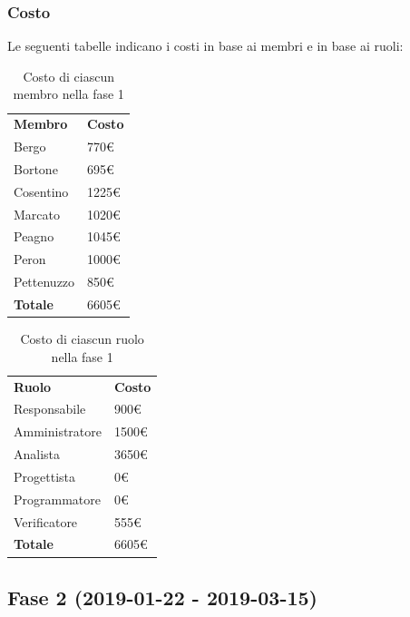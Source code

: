 	\subsubsection{Costo}
		Le seguenti tabelle indicano i costi in base ai membri e in base ai ruoli:
		\begin{table}[H]
			\centering		
			\begin{tabular}{| l | l |}
				\rowcolor{LightBlue}
				\textbf{\color{white}Membro}
				& \textbf{\color{white}Costo}\\
			
				Bergo 				& 770€\\
				Bortone 			& 695€\\
				Cosentino 		& 1225€\\
				Marcato 			& 1020€\\
				Peagno 			& 1045€\\
				Peron 				& 1000€\\
				Pettenuzzo 	& 850€\\ \hline
				\textbf{Totale} & 6605€\\ \hline
			\end{tabular}
			\caption{Costo di ciascun membro nella fase 1}
		\end{table}
		
		\begin{table}[H]
			\centering		
			\begin{tabular}{| l | l |}
				\rowcolor{LightBlue}
				\textbf{\color{white}Ruolo}
				& \textbf{\color{white}Costo}\\
			
				Responsabile 		& 900€\\
				Amministratore 	& 1500€\\
				Analista 				& 3650€\\			
				Progettista 			& 0€\\
				Programmatore 		& 0€\\
				Verificatore 		& 555€\\ \hline
				\textbf{Totale} 	& 6605€\\ \hline
			\end{tabular}
			\caption{Costo di ciascun ruolo nella fase 1}
		\end{table}
		

\subsection{Fase 2 (2019-01-22 - 2019-03-15)}
